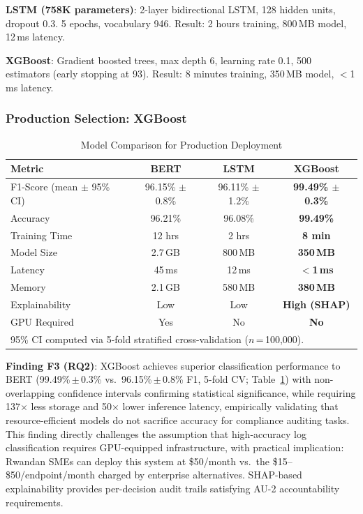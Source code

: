 \documentclass[11pt,conference]{IEEEtran}
\begin{document}
\textbf{LSTM (758K parameters)}: 2-layer bidirectional LSTM, 128 hidden units, dropout 0.3. 5 epochs, vocabulary 946. Result: 2 hours training, 800\,MB model, 12\,ms latency.

\textbf{XGBoost}: Gradient boosted trees, max depth 6, learning rate 0.1, 500 estimators (early stopping at 93). Result: 8 minutes training, 350\,MB model, $<$1\,ms latency.

\subsubsection{Production Selection: XGBoost}

\begin{table}[!t]
\centering
\caption{Model Comparison for Production Deployment}
\label{tab:model_comparison}
\begin{tabular}{@{}lccc@{}}
\toprule
\textbf{Metric} & \textbf{BERT} & \textbf{LSTM} & \textbf{XGBoost} \\
\midrule
F1-Score (mean $\pm$ 95\% CI) & 96.15\% $\pm$ 0.8\% & 96.11\% $\pm$ 1.2\% & \textbf{99.49\% $\pm$ 0.3\%} \\
Accuracy & 96.21\% & 96.08\% & \textbf{99.49\%} \\
\midrule
Training Time & 12 hrs & 2 hrs & \textbf{8 min} \\
Model Size & 2.7\,GB & 800\,MB & \textbf{350\,MB} \\
Latency & 45\,ms & 12\,ms & \textbf{$<$1\,ms} \\
Memory & 2.1\,GB & 580\,MB & \textbf{380\,MB} \\
Explainability & Low & Low & \textbf{High (SHAP)} \\
GPU Required & Yes & No & \textbf{No} \\
\bottomrule
\multicolumn{4}{l}{\footnotesize 95\% CI computed via 5-fold stratified cross-validation ($n$\,=\,100,000).} \\
\end{tabular}
\end{table}

\textbf{Finding F3 (RQ2)}: XGBoost achieves superior classification performance to BERT (99.49\%\,$\pm$\,0.3\% vs.\ 96.15\%\,$\pm$\,0.8\% F1, 5-fold CV; Table~\ref{tab:model_comparison}) with non-overlapping confidence intervals confirming statistical significance, while requiring 137$\times$ less storage and 50$\times$ lower inference latency, empirically validating that resource-efficient models do not sacrifice accuracy for compliance auditing tasks. This finding directly challenges the assumption that high-accuracy log classification requires GPU-equipped infrastructure, with practical implication: Rwandan SMEs can deploy this system at \$50/month vs.\ the \$15--\$50/endpoint/month charged by enterprise alternatives. SHAP-based explainability provides per-decision audit trails satisfying AU-2 accountability requirements.
\end{document}
